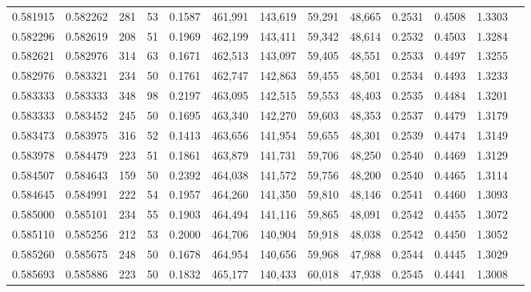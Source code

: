 \begin{tabular}{rrrrrrrrrrrrr}
0.581915 & 0.582262 &    281 &    53 &                                     0.1587 & 461,991 & 143,619 &  59,291 &  48,665 & 0.2531 & 0.4508 & 1.3303 \\
0.582296 & 0.582619 &    208 &    51 &                                     0.1969 & 462,199 & 143,411 &  59,342 &  48,614 & 0.2532 & 0.4503 & 1.3284 \\
0.582621 & 0.582976 &    314 &    63 &                                     0.1671 & 462,513 & 143,097 &  59,405 &  48,551 & 0.2533 & 0.4497 & 1.3255 \\
0.582976 & 0.583321 &    234 &    50 &                                     0.1761 & 462,747 & 142,863 &  59,455 &  48,501 & 0.2534 & 0.4493 & 1.3233 \\
0.583333 & 0.583333 &    348 &    98 &                                     0.2197 & 463,095 & 142,515 &  59,553 &  48,403 & 0.2535 & 0.4484 & 1.3201 \\
0.583333 & 0.583452 &    245 &    50 &                                     0.1695 & 463,340 & 142,270 &  59,603 &  48,353 & 0.2537 & 0.4479 & 1.3179 \\
0.583473 & 0.583975 &    316 &    52 &                                     0.1413 & 463,656 & 141,954 &  59,655 &  48,301 & 0.2539 & 0.4474 & 1.3149 \\
0.583978 & 0.584479 &    223 &    51 &                                     0.1861 & 463,879 & 141,731 &  59,706 &  48,250 & 0.2540 & 0.4469 & 1.3129 \\
0.584507 & 0.584643 &    159 &    50 &                                     0.2392 & 464,038 & 141,572 &  59,756 &  48,200 & 0.2540 & 0.4465 & 1.3114 \\
0.584645 & 0.584991 &    222 &    54 &                                     0.1957 & 464,260 & 141,350 &  59,810 &  48,146 & 0.2541 & 0.4460 & 1.3093 \\
0.585000 & 0.585101 &    234 &    55 &                                     0.1903 & 464,494 & 141,116 &  59,865 &  48,091 & 0.2542 & 0.4455 & 1.3072 \\
0.585110 & 0.585256 &    212 &    53 &                                     0.2000 & 464,706 & 140,904 &  59,918 &  48,038 & 0.2542 & 0.4450 & 1.3052 \\
0.585260 & 0.585675 &    248 &    50 &                                     0.1678 & 464,954 & 140,656 &  59,968 &  47,988 & 0.2544 & 0.4445 & 1.3029 \\
0.585693 & 0.585886 &    223 &    50 &                                     0.1832 & 465,177 & 140,433 &  60,018 &  47,938 & 0.2545 & 0.4441 & 1.3008 \\

\end{tabular}
